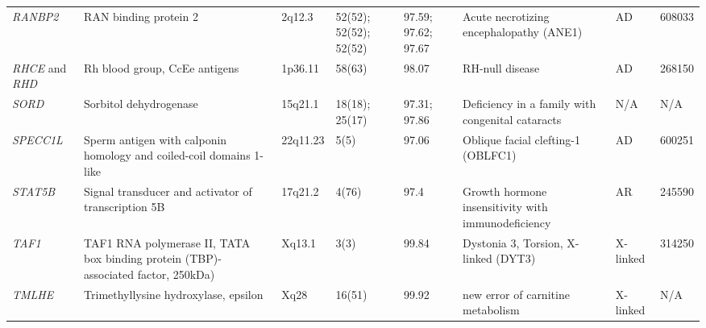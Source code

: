 \documentclass[final]{beamer}
\newlength{\onecolwid}
\newlength{\twocolwid}
\begin{document}
\begin{frame}[t]
\begin{columns}[t]
\begin{column}{\twocolwid}
\begin{table}[t!]
\begin{center}
\begin{tiny}
\begin{tabular}{|p{0.05\paperwidth}p{0.14\paperwidth}p{0.03\paperwidth}p{0.06\paperwidth}p{0.05\paperwidth}p{0.2\paperwidth}p{0.03\paperwidth}p{0.03\paperwidth}|}
\textit{RANBP2}&RAN binding protein 2 &2q12.3&52(52); 52(52); 52(52)&97.59; 97.62; 97.67&Acute necrotizing encephalopathy (ANE1)&AD&608033\\%
\textit{RHCE} and \textit{RHD}&Rh blood group, CcEe antigens &1p36.11&58(63)&98.07&RH-null disease&AD&268150\\%
\textit{SORD}&Sorbitol dehydrogenase&15q21.1&18(18); 25(17)&97.31; 97.86&Deficiency in a family with congenital cataracts&N/A&N/A\\%
\textit{SPECC1L}&Sperm antigen with calponin homology and coiled-coil domains 1-like &22q11.23&5(5)&97.06&Oblique facial clefting-1 (OBLFC1)&AD&600251\\%
\textit{STAT5B}&Signal transducer and activator of transcription 5B&17q21.2&4(76)&97.4&Growth hormone insensitivity with immunodeficiency&AR&245590\\%
\textit{TAF1}&TAF1 RNA polymerase II, TATA box binding protein (TBP)-associated factor, 250kDa)&Xq13.1&3(3)&99.84& Dystonia 3, Torsion, X-linked (DYT3)&X-linked&314250\\%
\textit{TMLHE}&Trimethyllysine hydroxylase, epsilon&Xq28 &16(51)&99.92&new error of carnitine metabolism&X-linked&N/A\\\hline
 \end{tabular}
\end{tiny}
 \end{center}
 \end{table}








      \begin{columns}[t,totalwidth=\twocolwid]	%

        \begin{column}{\onecolwid}



\end{column}
\end{columns}
\end{column}
\end{columns}
\end{frame}
\end{document}
